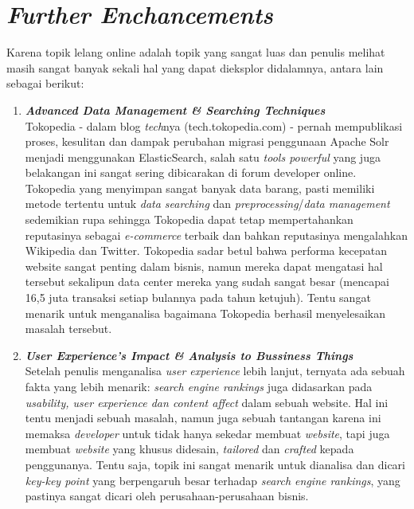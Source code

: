 	\section{\textit{Further Enchancements}}
	Karena topik lelang online adalah topik yang sangat luas dan penulis melihat masih sangat banyak sekali hal yang dapat dieksplor didalamnya, antara lain sebagai berikut:
	\begin{enumerate}
		\item \textbf{\textit{Advanced Data Management \& Searching Techniques}} \\
			Tokopedia - dalam blog \textit{tech}nya (tech.tokopedia.com) - pernah mempublikasi proses, kesulitan dan dampak perubahan migrasi penggunaan Apache Solr menjadi menggunakan ElasticSearch, salah satu \textit{tools powerful} yang juga belakangan ini sangat sering dibicarakan di forum developer online. Tokopedia yang menyimpan sangat banyak data barang, pasti memiliki metode tertentu untuk \textit{data searching} dan \textit{preprocessing}/\textit{data management} sedemikian rupa sehingga Tokopedia dapat tetap mempertahankan reputasinya sebagai \textit{e-commerce} terbaik dan bahkan reputasinya mengalahkan Wikipedia dan Twitter. Tokopedia sadar betul bahwa performa kecepatan website sangat penting dalam bisnis, namun mereka dapat mengatasi hal tersebut sekalipun data center mereka yang sudah sangat besar (mencapai 16,5 juta transaksi setiap bulannya pada tahun ketujuh). Tentu sangat menarik untuk menganalisa bagaimana Tokopedia berhasil menyelesaikan masalah tersebut.
		\item \textbf{\textit{User Experience's Impact \& Analysis to Bussiness Things}} \\
			Setelah penulis menganalisa \textit{user experience} lebih lanjut, ternyata ada sebuah fakta yang lebih menarik: \textit{search engine rankings} juga didasarkan pada \textit{usability, user experience dan content affect} dalam sebuah website. Hal ini tentu menjadi sebuah masalah, namun juga sebuah tantangan karena ini memaksa \textit{developer} untuk tidak hanya sekedar membuat \textit{website}, tapi juga membuat \textit{website} yang khusus didesain, \textit{tailored} dan \textit{crafted} kepada penggunanya. Tentu saja, topik ini sangat menarik untuk dianalisa dan dicari \textit{key-key point} yang berpengaruh besar terhadap \textit{search engine rankings}, yang pastinya sangat dicari oleh perusahaan-perusahaan bisnis.
			

\end{enumerate}
